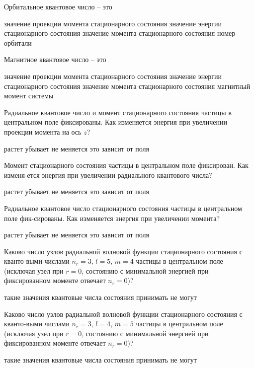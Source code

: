 \documentclass[11pt,a4paper]{exam}
\begin{document}
\begin{questions}
\question Орбитальное квантовое число – это
\begin{choices}
\choice значение проекции момента стационарного состояния
\choice значение энергии стационарного состояния
\choice значение момента стационарного состояния
\choice номер орбитали
\end{choices}

\question Магнитное квантовое число – это
\begin{choices}
\choice значение проекции момента стационарного состояния
\choice значение энергии стационарного состояния
\choice значение момента стационарного состояния
\choice магнитный момент системы
\end{choices}

\question Радиальное квантовое число и момент стационарного состояния частицы в центральном поле фиксированы. Как изменяется энергия при увеличении проекции момента на ось $z$?
\begin{choices}
\choice растет      
\choice убывает     
\choice не меняется    
\choice это зависит от поля
\end{choices}

\question Момент стационарного состояния частицы в центральном поле фиксирован. Как изменя-ется энергия при увеличении радиального квантового числа?
\begin{choices}
\choice растет      
\choice убывает     
\choice не меняется    
\choice это зависит от поля
\end{choices}

\question Радиальное квантовое число стационарного состояния частицы в центральном поле фик-сированы. Как изменяется энергия при увеличении момента?
\begin{choices}
\choice растет      
\choice убывает     
\choice не меняется    
\choice это зависит от поля
\end{choices}

\question Каково число узлов радиальной волновой функции стационарного состояния с кванто-выми числами ${n_r} = 3$, $l = 5$, $m = 4$ частицы в центральном поле (исключая узел при $r = 0$, состоянию с минимальной энергией при фиксированном моменте отвечает ${n_r} = 0$)?
\begin{choices}
\choice такие значения квантовые числа состояния принимать не могут
\end{choices}

\question Каково число узлов радиальной волновой функции стационарного состояния с кванто-выми числами ${n_r} = 3$, $l = 4$, $m = 5$ частицы в центральном поле (исключая узел при $r = 0$, состоянию с минимальной энергией при фиксированном моменте отвечает ${n_r} = 0$)?
\begin{choices}
\choice такие значения квантовые числа состояния принимать не могут
\end{choices}


\end{questions}
\end{document}

